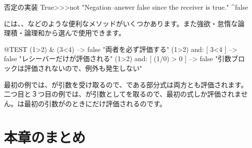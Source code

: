 \documentclass[a4paper,10pt,twoside]{book}
\begin{document}
\begin{method}{否定の実装}
True>>>not
    "Negation--answer false since the receiver is true."
    ^false
\end{method}

には、、などのような便利なメソッドがいくつかあります。また強欲・怠惰な論理積・論理和から選んで使用できます。

\begin{code}{@TEST}
(1>2) & (3<4)              --> false    "両者を必ず評価する"
(1>2) and: [ 3<4 ]        --> false    "レシーバーだけが評価される"
(1>2) and: [ (1/0) > 0 ] --> false    "引数ブロックは評価されないので、例外も発生しない"
\end{code}

最初の例では、が引数を受け取るので、である部分式は両方とも評価されます。
二つ目と３つ目の例では、が引数としてを取るので、最初の式しか評価されません。は最初の引数がのときにだけ評価されるのです。


\section{本章のまとめ}
\end{document}
